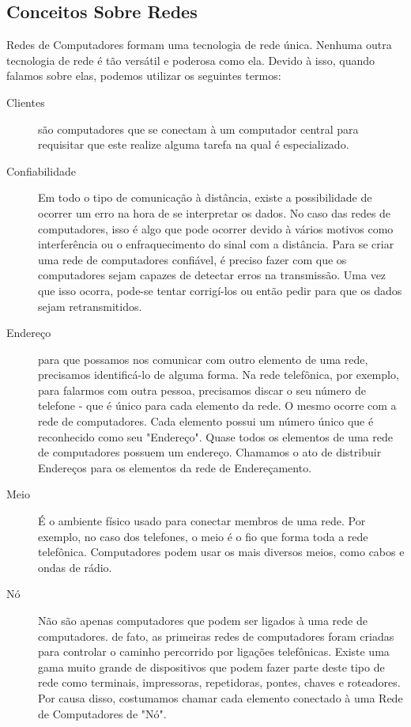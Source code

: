 	\subsection{Conceitos Sobre Redes}
	Redes de Computadores formam uma tecnologia de rede única. Nenhuma outra tecnologia de rede é tão versátil e poderosa como ela. Devido à isso, quando falamos sobre elas, podemos utilizar os seguintes termos:
	\begin{description}
		\item[Clientes] são computadores que se conectam à um computador central para requisitar que este realize alguma tarefa na qual é especializado.
		\item[Confiabilidade] Em todo o tipo de comunicação à distância, existe a possibilidade de ocorrer um erro na hora de se interpretar os dados. No caso das redes de computadores, isso é algo que pode ocorrer devido à vários motivos como interferência ou o enfraquecimento do sinal com a distância. Para se criar uma rede de computadores confiável, é preciso fazer com que os computadores sejam capazes de detectar erros na transmissão. Uma vez que isso ocorra, pode-se tentar corrigí-los ou então pedir para que os dados sejam retransmitidos.
		\item[Endereço] para que possamos nos comunicar com outro elemento de uma rede, precisamos identificá-lo de alguma forma. Na rede telefônica, por exemplo, para falarmos com outra pessoa, precisamos discar o seu número de telefone - que é único para cada elemento da rede. O mesmo ocorre com a rede de computadores. Cada elemento possui um número único que é reconhecido como seu "Endereço". Quase todos os elementos de uma rede de computadores possuem um endereço. Chamamos o ato de distribuir Endereços para os elementos da rede de Endereçamento.
		\item[Meio] É o ambiente físico usado para conectar membros de uma rede. Por exemplo, no caso dos telefones, o meio é o fio que forma toda a rede telefônica. Computadores podem usar os mais diversos meios, como cabos e ondas de rádio.
		\item[Nó] Não são apenas computadores que podem ser ligados à uma rede de computadores. de fato, as primeiras redes de computadores foram criadas para controlar o caminho percorrido por ligações telefônicas. Existe uma gama muito grande de dispositivos que podem fazer parte deste tipo de rede como terminais, impressoras, repetidoras, pontes, chaves e roteadores. Por causa disso, costumamos chamar cada elemento conectado à uma Rede de Computadores de "Nó".

\end{description}
